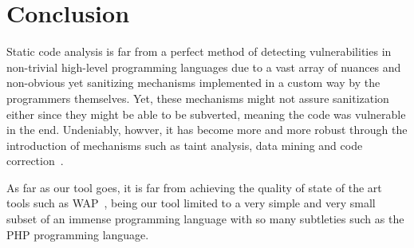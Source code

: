 \section*{Conclusion}
\label{sec:conclusion}

Static code analysis is far from a perfect method of detecting vulnerabilities
in non-trivial high-level programming languages due to a vast array of nuances
and non-obvious yet sanitizing mechanisms implemented in a custom way by the
programmers themselves. Yet, these mechanisms might not assure sanitization
either since they might be able to be subverted, meaning the code was vulnerable
in the end. Undeniably, howver, it has become more and more robust through the
introduction of mechanisms such as taint analysis, data mining and code
correction~\cite{Medeiros:2014:ADC:2566486.2568024}.

As far as our tool goes, it is far from achieving the quality of state of the
art tools such as WAP~\cite{Medeiros:2014:ADC:2566486.2568024,wap-manual:2017},
being our tool limited to a very simple and very small subset of an immense
programming language with so many subtleties such as the PHP programming
language.
